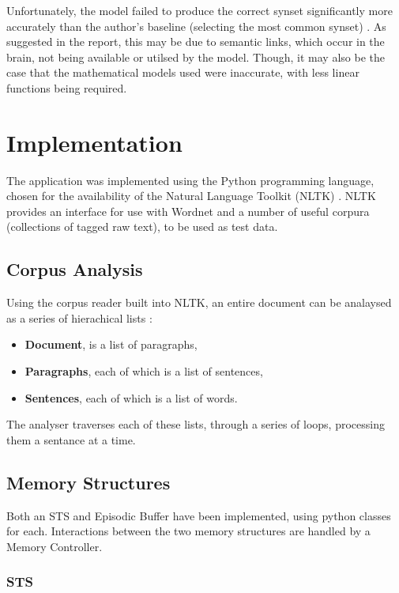 \documentclass[]{article}
\begin{document}
Unfortunately, the model failed to produce the correct synset significantly more accurately than the author's baseline (selecting the most common synset) \cite{MattBurkePrevious}. As suggested in the report, this may be due to semantic links, which occur in the brain, not being available or utilsed by the model. Though, it may also be the case that the mathematical models used were inaccurate, with less linear functions being required.


\section{Implementation}
\label{sec:Implementation}
The application was implemented using the Python programming language, chosen for the availability of the Natural Language Toolkit (NLTK) \cite{NLTK}. NLTK provides an interface for use with Wordnet and a number of useful corpura (collections of tagged raw text), to be used as test data.

\subsection{Corpus Analysis}
\label{sec:CorpusAnalysis}
Using the corpus reader built into NLTK, an entire document can be analaysed as a series of hierachical lists \cite{NLTK}:

\begin{itemize}
	\item \textbf{Document}, is a list of paragraphs,
	\item \textbf{Paragraphs}, each of which is a list of sentences,
	\item \textbf{Sentences}, each of which is a list of words.
\end{itemize}

The analyser traverses each of these lists, through a series of loops, processing them a sentance at a time.

\subsection{Memory Structures}
\label{sec:ImplementedMemoryStructures}

Both an STS and Episodic Buffer have been implemented, using python classes for each. Interactions between the two memory structures are handled by a Memory Controller.

\subsubsection{STS}
\label{sec:ImplementedSTS}
\end{document}
